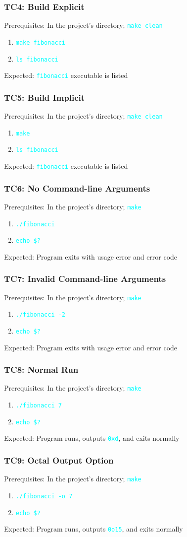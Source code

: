 \documentclass{article}
\newcommand{\code}[1]{\textcolor{cyan}{\texttt{#1}}}
\begin{document}
\subsubsection{TC4: Build Explicit}
Prerequisites: In the project's directory; \code{make clean}
\begin{enumerate}
	\item \code{make fibonacci}
	\item \code{ls fibonacci}
\end{enumerate}
Expected: \code{fibonacci} executable is listed


\subsubsection{TC5: Build Implicit}
Prerequisites: In the project's directory; \code{make clean}
\begin{enumerate}
	\item \code{make}
	\item \code{ls fibonacci}
\end{enumerate}
Expected: \code{fibonacci} executable is listed


\subsubsection{TC6: No Command-line Arguments}
Prerequisites: In the project's directory; \code{make}
\begin{enumerate}
	\item \code{./fibonacci}
	\item \code{echo \$?}
\end{enumerate}
Expected: Program exits with usage error and error code


\subsubsection{TC7: Invalid Command-line Arguments}
Prerequisites: In the project's directory; \code{make}
\begin{enumerate}
	\item \code{./fibonacci -2}
	\item \code{echo \$?}
\end{enumerate}
Expected: Program exits with usage error and error code


\subsubsection{TC8: Normal Run}
Prerequisites: In the project's directory; \code{make}
\begin{enumerate}
	\item \code{./fibonacci 7}
	\item \code{echo \$?}
\end{enumerate}
Expected: Program runs, outputs \code{0xd}, and exits normally


\subsubsection{TC9: Octal Output Option}
Prerequisites: In the project's directory; \code{make}
\begin{enumerate}
	\item \code{./fibonacci -o 7}
	\item \code{echo \$?}
\end{enumerate}
Expected: Program runs, outputs \code{0o15}, and exits normally
\end{document}
